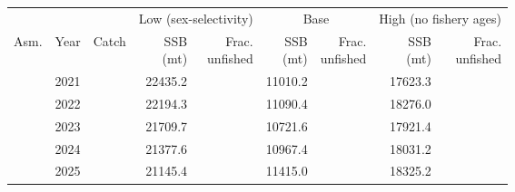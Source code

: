 \begin{table}
\centering
\begin{tabular}[t]{>{}l|l>{}rr>{}r|rrrr}
\toprule
\multicolumn{1}{c}{ } & \multicolumn{1}{c}{ } & \multicolumn{1}{c}{ } & \multicolumn{2}{c}{Low (sex-selectivity)} & \multicolumn{2}{c}{Base} & \multicolumn{2}{c}{High (no fishery ages)} \\
\cmidrule(l{3pt}r{3pt}){4-5} \cmidrule(l{3pt}r{3pt}){6-7} \cmidrule(l{3pt}r{3pt}){8-9}
Asm. & Year & Catch & \makecell{SSB\\(mt)} & \makecell{Frac.\\unfished} & \makecell{SSB\\(mt)} & \makecell{Frac.\\unfished} & \makecell{SSB\\(mt)} & \makecell{Frac.\\unfished}\\
\midrule
 & 2021 & \cellcolor[HTML]{B0A473}{\textcolor{white}{1200.100}} & 22435.2 & \cellcolor[HTML]{2B748E}{\textcolor{white}{0.614}} & 11010.2 & \cellcolor[HTML]{2E6E8E}{\textcolor{white}{0.642}} & 17623.3 & \cellcolor[HTML]{375B8D}{\textcolor{white}{0.719}}\\

 & 2022 & \cellcolor[HTML]{B0A473}{\textcolor{white}{1200.100}} & 22194.3 & \cellcolor[HTML]{2A768E}{\textcolor{white}{0.608}} & 11090.4 & \cellcolor[HTML]{2E6D8E}{\textcolor{white}{0.646}} & 18276.0 & \cellcolor[HTML]{3A538B}{\textcolor{white}{0.746}}\\

 & 2023 & \cellcolor[HTML]{B0A473}{\textcolor{white}{1200.100}} & 21709.7 & \cellcolor[HTML]{29798E}{\textcolor{white}{0.595}} & 10721.6 & \cellcolor[HTML]{2C728E}{\textcolor{white}{0.625}} & 17921.4 & \cellcolor[HTML]{38588C}{\textcolor{white}{0.731}}\\

 & 2024 & \cellcolor[HTML]{B0A473}{\textcolor{white}{1200.100}} & 21377.6 & \cellcolor[HTML]{287C8E}{\textcolor{white}{0.585}} & 10967.4 & \cellcolor[HTML]{2E6F8E}{\textcolor{white}{0.639}} & 18031.2 & \cellcolor[HTML]{39558C}{\textcolor{white}{0.736}}\\

 & 2025 & \cellcolor[HTML]{B0A473}{\textcolor{white}{1200.100}} & 21145.4 & \cellcolor[HTML]{287D8E}{\textcolor{white}{0.579}} & 11415.0 & \cellcolor[HTML]{31688E}{\textcolor{white}{0.665}} & 18325.2 & \cellcolor[HTML]{3B528B}{\textcolor{white}{0.748}}\\


\end{tabular}
\end{table}
